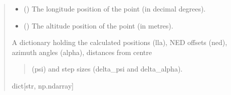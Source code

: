 \documentclass[letterpaper,10pt,english]{sphinxmanual}
\begin{document}
\begin{fulllineitems}
\begin{fulllineitems}
\begin{quote}
\begin{description}
\begin{itemize}
\item {} 
\sphinxAtStartPar
{} () \textendash{} The longitude position of the point (in decimal degrees).

\item {} 
\sphinxAtStartPar
{} () \textendash{} The altitude position of the point (in metres).

\end{itemize}

\sphinxAtStartPar

\sphinxAtStartPar
A dictionary holding the calculated positions (lla),
NED offsets (ned), azimuth angles (alpha), distances from centre
\begin{quote}

\sphinxAtStartPar
(psi) and step sizes (delta\_psi and delta\_alpha).
\end{quote}


\sphinxAtStartPar
dict{[}str, np.ndarray{]}

\end{description}\end{quote}

\end{fulllineitems}


\end{fulllineitems}

\end{document}
